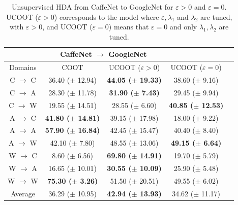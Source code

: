 \begin{table}[h]
	\begin{center}
		\begin{small}
			\begin{sc}
				\begin{tabular}{c c c c c}
					\toprule
					& \multicolumn{2}{c}{CaffeNet $\to$ GoogleNet} \\
					\midrule
					Domains & COOT & UCOOT ($\varepsilon > 0$) & UCOOT ($\varepsilon = 0$) \\
					\midrule

					C $\to$ C & 36.40 ($\pm$ 12.94) & \textbf{44.05 ($\pm$ 19.33)} & 38.60 ($\pm$ 9.16) \\
					\hline
					C $\to$ A & 28.30 ($\pm$ 11.78) & \textbf{31.90 ($\pm$ 7.43)} & 29.45 ($\pm$ 9.94) \\
					\hline
					C $\to$ W & 19.55 ($\pm$ 14.51) & 28.55 ($\pm$ 6.60) & \textbf{40.85 ($\pm$ 12.53)} \\
					\hline

					A $\to$ C & \textbf{41.80 ($\pm$ 14.81)} & 39.15 ($\pm$ 17.98) & 18.00 ($\pm$ 9.22) \\
					\hline
					A $\to$ A & \textbf{57.90 ($\pm$ 16.84)} & 42.45 ($\pm$ 15.47) & 40.40 ($\pm$ 8.40) \\
					\hline
					A $\to$ W & 42.10 ($\pm$ 7.80) & 48.55 ($\pm$ 13.06) & \textbf{49.15 ($\pm$ 6.64)} \\
					\hline

					W $\to$ C & 8.60 ($\pm$ 6.56) & \textbf{69.80 ($\pm$ 14.91)} & 19.70 ($\pm$ 5.79) \\
					\hline
					W $\to$ A & 16.65 ($\pm$ 10.01) & \textbf{30.55 ($\pm$ 10.09)} & 25.90 ($\pm$ 5.48) \\
					\hline
					W $\to$ W & \textbf{75.30 ($\pm$ 3.26)} & 51.50 ($\pm$ 20.51) & 49.55 ($\pm$ 6.02) \\
					\bottomrule
					Average & 36.29 ($\pm$ 10.95) & \textbf{42.94 ($\pm$ 13.93)} & 34.62 ($\pm$ 11.17) \\
					\bottomrule

				\end{tabular}
			\end{sc}
		\end{small}
	\end{center}
	\caption{Unsupervised HDA from CaffeNet to GoogleNet for $\varepsilon > 0$ and $\varepsilon = 0$.
  UCOOT ($\varepsilon > 0$) corresponds to the model where $\varepsilon, \lambda_1$ and $\lambda_2$
  are tuned, with $\varepsilon > 0$, and UCOOT ($\varepsilon = 0$) means that $\varepsilon = 0$
  and only $\lambda_1, \lambda_2$ are tuned. }
	\label{tab:hda2}
\end{table}

